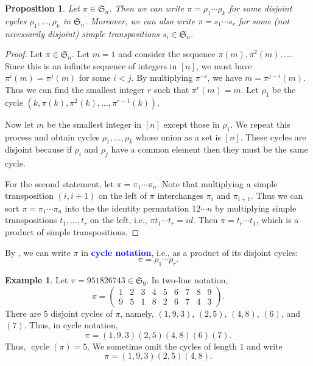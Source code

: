 \documentclass[oneside]{book}
\numberwithin{equation}{section}
\newtheorem{prop}[thm]{Proposition}
\theoremstyle{definition}
\newtheorem{exam}[thm]{Example}
\newcommand\cycle{\operatorname{cycle}}
\newcommand\sym{\mathfrak{S}}
\renewcommand\emph[1]{\textcolor{blue}{\bf #1}}
\begin{document}
\begin{prop}\label{pro:cycle-decomp}
  Let \( \pi \in \sym_n \). Then we can write
  \( \pi = \rho_1 \cdots \rho_k \) for some disjoint cycles
  \( \rho_1,\dots,\rho_k \) in \( \sym_n \). Moreover, we can also
  write \( \pi = s_1 \cdots s_r \) for some (not necessarily disjoint)
  simple transpositions \( s_i\in \sym_n \).
\end{prop}
\begin{proof}
  Let \( \pi\in \sym_n \). Let \( m=1 \) and consider the sequence
  \( \pi(m), \pi^2(m), \ldots \). Since this is an infinite sequence
  of integers in \( [n] \), we must have \( \pi^i(m) = \pi^j(m) \) for
  some \( i<j \). By multiplying \( \pi^{-i} \), we have
  \( m = \pi^{j-i}(m) \). Thus we can find the smallest integer
  \( r \) such that \( \pi^r(m) = m \). Let \( \rho_1 \) be the cycle
  \( (k,\pi(k), \pi^2(k),\dots,\pi^{r-1}(k)) \).

  Now let \( m \) be the smallest integer in \( [n] \) except those in
  \( \rho_1 \). We repeat this process and obtain cycles
  \( \rho_1,\dots,\rho_k \) whose union as a set is \( [n] \). These
  cycles are disjoint because if \( \rho_i \) and \( \rho_j \) have a
  common element then they must be the same cycle.

  For the second statement, let \( \pi=\pi_1 \cdots \pi_n \). Note
  that multiplying a simple transposition \( (i,i+1) \) on the left of
  \( \pi \) interchanges \( \pi_i \) and \( \pi_{i+1} \). Thus we can
  sort \( \pi=\pi_1 \cdots \pi_n \) into the the identity permutation
  \( 1 2 \cdots n \) by multiplying simple transpositions
  \( t_1, \ldots, t_r \) on the left, i.e.,
  \( \pi t_1 \cdots t_r = id \). Then \( \pi = t_r \cdots t_1 \),
  which is a product of simple transpositions.
\end{proof}


By , we can write \( \pi \) in \emph{cycle
  notation}, i.e., as a product of its disjoint cycles:
\[
  \pi = \rho_1 \cdots \rho_r.
\]

\begin{exam}
  Let \( \pi = 951826743 \in \sym_9 \).
  In two-line notation,
  \[
    \pi =
\begin{pmatrix}
1 & 2 & 3 & 4 & 5 & 6 & 7 & 8 & 9\\
9 & 5 & 1 & 8 & 2 & 6 & 7 & 4 & 3
\end{pmatrix}.
  \]
  There are 5 disjoint cycles of \( \pi \), namely, \( (1,9,3) \),
  \( (2,5) \), \( (4,8) \), \( (6) \), and \( (7) \). Thus, in cycle
  notation,
  \[
    \pi = (1,9,3)(2,5)(4,8) (6) (7).
  \]
  Thus, \( \cycle(\pi) = 5 \). We sometime omit the cycles of length
  \( 1 \) and write
  \[
    \pi = (1,9,3)(2,5)(4,8).
  \]
\end{exam}
\end{document}
